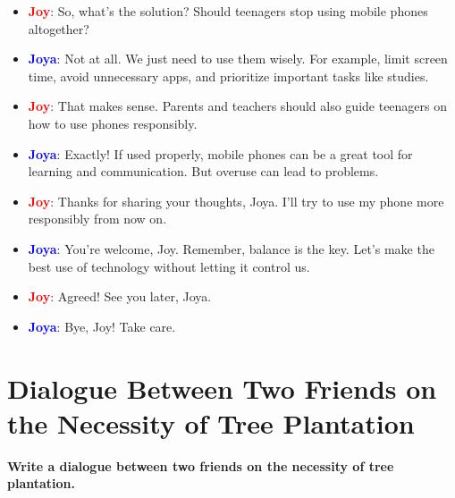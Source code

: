 \documentclass{article}
\begin{document}
\begin{itemize}
    \item \textbf{\textcolor{red}{Joy}}: So, what’s the solution? Should teenagers stop using mobile phones altogether?
    \item \textbf{\textcolor{blue}{Joya}}: Not at all. We just need to use them wisely. For example, limit screen time, avoid unnecessary apps, and prioritize important tasks like studies.
    \item \textbf{\textcolor{red}{Joy}}: That makes sense. Parents and teachers should also guide teenagers on how to use phones responsibly.
    \item \textbf{\textcolor{blue}{Joya}}: Exactly! If used properly, mobile phones can be a great tool for learning and communication. But overuse can lead to problems.
    \item \textbf{\textcolor{red}{Joy}}: Thanks for sharing your thoughts, Joya. I’ll try to use my phone more responsibly from now on.
    \item \textbf{\textcolor{blue}{Joya}}: You’re welcome, Joy. Remember, balance is the key. Let’s make the best use of technology without letting it control us.
    \item \textbf{\textcolor{red}{Joy}}: Agreed! See you later, Joya.
    \item \textbf{\textcolor{blue}{Joya}}: Bye, Joy! Take care.
\end{itemize}


\section*{Dialogue Between Two Friends on the Necessity of Tree Plantation}

\begin{flushleft}
    \textbf{\large Write a dialogue between two friends on the necessity of tree plantation.}
\end{flushleft}
\end{document}
